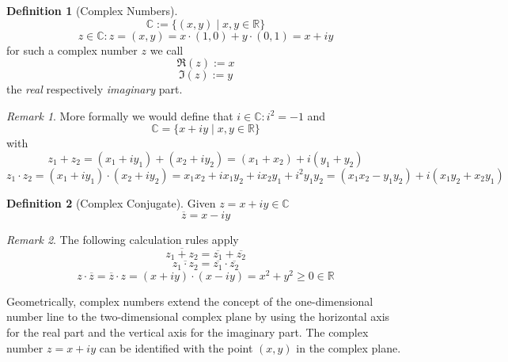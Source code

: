 \documentclass[english,titlepage]{uzhpub}
\theoremstyle{definition}
\newtheorem{definition}{Definition}[section]
\theoremstyle{plain}
\theoremstyle{remark}
\newtheorem*{remark}{Remark}
\theoremstyle{example}
\begin{document}
   \begin{definition}[Complex Numbers]
      \[\mathbb{C} :=  \{(x, y) \mid x, y \in \mathbb{R}\}\]
      \[z \in \mathbb{C}: z = (x, y) = x \cdot (1, 0) + y \cdot (0, 1) = x + iy\]
      for such a complex number \(z\) we call
      \[\Re(z) := x\]
      \[\Im(z) := y\]
      the \textit{real} respectively \textit{imaginary} part.
   \end{definition}
   \begin{remark}
      More formally we would define that \(i \in \mathbb{C}: i^2 = -1\) and
      \[\mathbb{C} = \{x + iy \mid x, y \in \mathbb{R}\}\]
      with
      \[z_1 + z_2 = (x_1 + iy_1) + (x_2 + iy_2) = (x_1 + x_2) + i(y_1 + y_2)\]
      \[z_1 \cdot z_2 = (x_1 + iy_1) \cdot (x_2 + iy_2) = x_1x_2 + ix_1y_2 + ix_2y_1 + i^2y_1y_2 = (x_1x_2 - y_1y_2) + i(x_1y_2 + x_2y_1)\]
   \end{remark}

   \begin{definition}[Complex Conjugate]
      Given \(z = x + iy \in \mathbb{C}\)
      \[\overline{z} = x - iy\]
   \end{definition}
   \begin{remark}
      The following calculation rules apply
      \[\overline{z_1 + z_2} = \overline{z_1} + \overline{z_2}\]
      \[\overline{z_1 \cdot z_2} = \overline{z_1} \cdot \overline{z_2}\]
      \[z \cdot \overline{z} = \overline{z} \cdot z = (x+iy) \cdot (x-iy) = x^2 + y^2 \geq 0 \in \mathbb{R}\]
   \end{remark}

   Geometrically, complex numbers extend the concept of the one-dimensional number line to the two-dimensional complex plane by using the horizontal axis for the real part and the vertical axis for the imaginary part.
   The complex number \(z = x + iy\) can be identified with the point \((x, y)\) in the complex plane.
\end{document}
